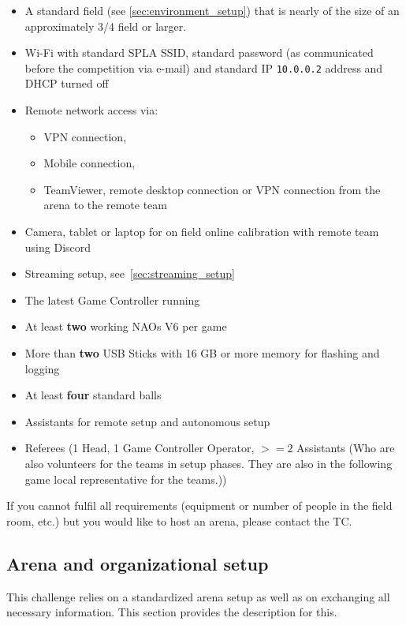 \begin{itemize}
    \item A standard field (see \ref{sec:environment_setup}) that is nearly of the size of an approximately 3/4 field or larger.
	\item Wi-Fi with standard SPL\textunderscore A SSID, standard password (as communicated before the competition via e-mail) and standard IP \texttt{10.0.0.2} address and DHCP turned off
    \item Remote network access via:
    \begin{itemize}
        \item VPN connection,
        \item Mobile connection,
        \item TeamViewer, remote desktop connection or VPN connection from the arena to the remote team
    \end{itemize}
    \item Camera, tablet or laptop for on field online calibration with remote team using Discord
    \item Streaming setup, see~\ref{sec:streaming_setup}
	\item The latest Game Controller running
    \item At least \textbf{two} working NAOs V6 per game
    \item More than \textbf{two} USB Sticks with 16 GB or more memory for flashing and logging 
    \item At least \textbf{four} standard balls
    \item Assistants for remote setup and autonomous setup
    \item Referees (1 Head, 1 Game Controller Operator, $>= 2$ Assistants (Who are also volunteers for the teams in setup phases. They are also in the following game local representative for the teams.))
\end{itemize}

If you cannot fulfil all requirements (equipment or number of people in the field room, etc.) but you would like to host an arena, please contact the TC.

\subsection{Arena and organizational setup}
\label{sec:arean-org-setup}
This challenge relies on a standardized arena setup as well as on exchanging all necessary information. This section provides the description for this.

